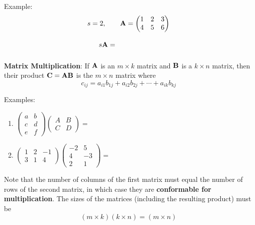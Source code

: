 \documentclass[]{book}
\theoremstyle{definition}
\theoremstyle{definition}
\theoremstyle{definition}
\theoremstyle{remark}
\begin{document}
Example:
\[s=2, \qquad {\bf A}=\begin{pmatrix} 1 & 2 & 3 \\ 4 & 5 & 6 \end{pmatrix}\]
\[s {\bf A} = \phantom{\begin{pmatrix} 2 & 4 & 6 \\ 8 & 10 & 12 \end{pmatrix}}\]

\textbf{Matrix Multiplication}: If \({\bf A}\) is an \(m\times k\)
matrix and \(\bf B\) is a \(k\times n\) matrix, then their product
\(\bf C = A B\) is the \(m\times n\) matrix where
\[c_{ij}=a_{i1}b_{1j}+a_{i2}b_{2j}+\cdots+a_{ik}b_{kj}\]

Examples:

\begin{enumerate}
        \item $\begin{pmatrix} a&b\\c&d\\e&f \end{pmatrix} \begin{pmatrix} A&B\\C&D \end{pmatrix}
            = \phantom{\begin{pmatrix} aA+bC&aB+bD\\cA+dC&cB+dD\\eA+fC&eB+fD \end{pmatrix}}$ 
        
        \item $\begin{pmatrix} 1&2&-1\\3&1&4 \end{pmatrix} \begin{pmatrix} -2&5\\4&-3\\2&1\end{pmatrix} = 
            \phantom{\begin{pmatrix} 1(-2)+2(4)-1(2)&1(5)+2(-3)-1(1)\\
                3(-2)+1(4)+4(2)&3(5)+1(-3)+4(1)\end{pmatrix} =
            \begin{pmatrix} 4&-2\\6&16\end{pmatrix}}$
    \end{enumerate}

Note that the number of columns of the first matrix must equal the
number of rows of the second matrix, in which case they are
\textbf{conformable for multiplication}. The sizes of the matrices
(including the resulting product) must be
\[(m\times k)(k\times n)=(m\times n)\]
\end{document}
